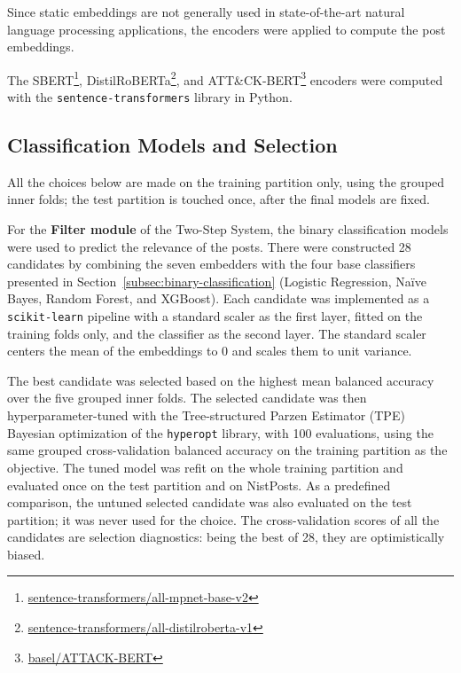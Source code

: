 Since static embeddings are not generally used in state-of-the-art natural language processing applications, the encoders were applied to compute the post embeddings.

The SBERT{\footnote{\href{https://huggingface.co/sentence-transformers/all-mpnet-base-v2}{sentence-transformers/all-mpnet-base-v2}}}, DistilRoBERTa{\footnote{\href{https://huggingface.co/sentence-transformers/all-distilroberta-v1}{sentence-transformers/all-distilroberta-v1}}}, and ATT{\&}CK-BERT{\footnote{\href{https://huggingface.co/basel/ATTACK-BERT}{basel/ATTACK-BERT}}} encoders were computed with the \texttt{sentence-transformers} library in Python.

\subsection{Classification Models and Selection}\label{subsec:classification-models}
All the choices below are made on the training partition only, using the grouped inner folds; the test partition is touched once, after the final models are fixed.

For the \textbf{Filter module} of the Two-Step System, the binary classification models were used to predict the relevance of the posts. There were constructed 28 candidates by combining the seven embedders with the four base classifiers presented in Section~\ref{subsec:binary-classification} (Logistic Regression, Naïve Bayes, Random Forest, and XGBoost). Each candidate was implemented as a \texttt{scikit-learn} pipeline with a standard scaler as the first layer, fitted on the training folds only, and the classifier as the second layer. The standard scaler centers the mean of the embeddings to 0 and scales them to unit variance.

The best candidate was selected based on the highest mean balanced accuracy over the five grouped inner folds. The selected candidate was then hyperparameter-tuned with the Tree-structured Parzen Estimator (TPE) Bayesian optimization of the \texttt{hyperopt} library, with 100 evaluations, using the same grouped cross-validation balanced accuracy on the training partition as the objective. The tuned model was refit on the whole training partition and evaluated once on the test partition and on NistPosts. As a predefined comparison, the untuned selected candidate was also evaluated on the test partition; it was never used for the choice. The cross-validation scores of all the candidates are selection diagnostics: being the best of 28, they are optimistically biased.

